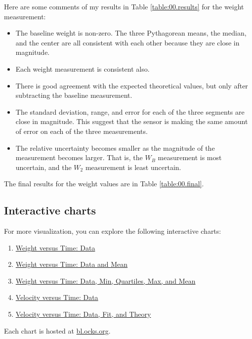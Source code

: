 Here are some comments of my results in Table \ref{table:00.results} for the weight measurement:
\begin{itemize}
    \item The baseline weight is non-zero. The three Pythagorean means, the median, and the center are all consistent with each other because they are close in magnitude.
    \item Each weight measurement is consistent also.
    \item There is good agreement with the expected theoretical values, but only after subtracting the baseline measurement.
    \item The standard deviation, range, and error for each of the three segments are close in magnitude. This suggest that the sensor is making the same amount of error on each of the three measurements.
    \item The relative uncertainty becomes smaller as the magnitude of the measurement becomes larger. That is, the $W_{B}$ measurement is most uncertain, and the $W_{2}$ measurement is least uncertain.
\end{itemize}
The final results for the weight values are in Table \ref{table:00.final}.
%
\subsection{Interactive charts}
%
For more visualization, you can explore the following interactive charts:
\begin{enumerate}
    \item \href{https://bl.ocks.org/meirizarrygelpi/4ff9e1ad0a6c6e7ccee79f7f41a793e6}{Weight versus Time: Data}
    \item \href{https://bl.ocks.org/meirizarrygelpi/1ef52b7ff946234fdc74aa956ccf83c9}{Weight versus Time: Data and Mean}
    \item \href{https://bl.ocks.org/meirizarrygelpi/faf2f927d6886b88b075ff7cdb631b30}{Weight versus Time: Data, Min, Quartiles, Max, and Mean}
    \item \href{https://bl.ocks.org/meirizarrygelpi/fd044bb826a7a8e4f141293fa4a64de9}{Velocity versus Time: Data}
    \item \href{https://bl.ocks.org/meirizarrygelpi/d7a581246c16a7763681e5cad1bcad48}{Velocity versus Time: Data, Fit, and Theory}
\end{enumerate}
Each chart is hosted at \href{https://bl.ocks.org/}{bl.ocks.org}.
%
